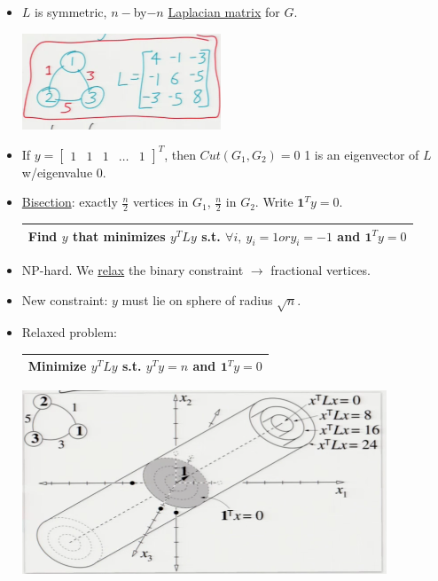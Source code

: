 \documentclass[10pt]{article}
\begin{document}
\begin{itemize}
		\item $L$ is symmetric, $n-$by$-n$ \underline{Laplacian matrix} for $G$.
			\begin{center}
				\includegraphics{../images/cutexample}
			\end{center}
		\item If $y = \begin{bmatrix}
			1 & 1& 1 & \dots & 1
		\end{bmatrix}^{T}$, then $Cut(G_{1}, G_{2}) = 0$ 1 is an eigenvector of $L$ w/eigenvalue 0.
		\item \underline{Bisection}: exactly $\frac{n}{2}$ vertices in $G_{1}$, $\frac{n}{2}$ in $G_{2}$. Write $\textbf{1}^{T}y = 0$.
		\begin{center}
			\begin{tabular}{|c|}
				\hline
				Find $y$ that minimizes $y^{T}Ly$ s.t. $\forall i, \ y_{i} = 1 or y_{i} = -1$ and $\textbf{1}^{T}y =0$\\
				\hline
			\end{tabular}
		\end{center}
	\item NP-hard. We \underline{relax} the binary constraint $\rightarrow$ fractional vertices.
	\item New constraint: $y$ must lie on sphere of radius $\sqrt{n}$.
	\item Relaxed problem:
		\begin{center}
			\begin{tabular}{|c|}
				\hline
				Minimize $y^{T}Ly$ s.t. $y^{T}y = n$ and $\textbf{1}^{T}y = 0$\\
				\hline
			\end{tabular}
		\end{center}
		\begin{center}
			\includegraphics{../images/relaxed}

\end{center}
\end{itemize}
\end{document}
